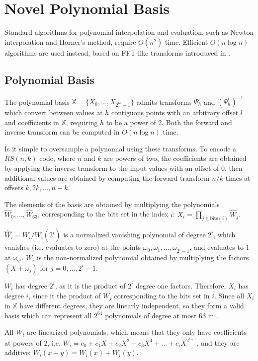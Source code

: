 \chapter{Novel Polynomial Basis}

Standard algorithms for polynomial interpolation and evaluation, such as Newton interpolation and Horner's method, require $O(n^2)$ time.
Efficient $O(n \log n)$ algorithms are used instead, based on FFT-like transforms introduced in \cite{novel-poly}.

\section{Polynomial Basis}

The polynomial basis $\mathbb{X} = \{X_0, \ldots, X_{2^{64} - 1}\}$ admits transforms $\Psi_h^l$ and $(\Psi_h^l)^{-1}$ which convert between values at $h$ contiguous points with an arbitrary offset $l$ and coefficients in $\mathbb{X}$, requiring $h$ to be a power of 2.
Both the forward and inverse transform can be computed in $O(n \log n)$ time.

Is it simple to oversample a polynomial using these transforms.
To encode a $RS(n, k)$ code, where $n$ and $k$ are powers of two, the coefficients are obtained by applying the inverse transform to the input values with an offset of $0$, then additional values are obtained by computing the forward transform $n/k$ times at offsets $k, 2k, \ldots, n - k$.

The elements of the basis are obtained by multiplying the polynomials $\hat{W}_0, \ldots, \hat{W}_{63}$, corresponding to the bits set in the index $i$: $X_i = \prod_{j \in \text{bits}(i)} \hat{W}_j$.

$\hat{W}_i = W_i / W_i(2^{i})$ is a normalized vanishing polynomial of degree $2^{i}$, which vanishes (i.e. evaluates to zero) at the points $\omega_0, \omega_1, \ldots, \omega_{2^{i} - 1}$, and evaluates to $1$ at $\omega_{2^{i}}$.
$W_i$ is the non-normalized polynomial obtained by multiplying the factors $(X + \omega_j)$ for $j = 0, \ldots, 2^{i} - 1$.

$W_i$ has degree $2^{i}$, as it is the product of $2^{i}$ degree one factors. Therefore, $X_i$ has degree $i$, since it the product of $W_j$ corresponding to the bits set in $i$.
Since all $X_i$ in $\mathbb{X}$ have different degrees, they are linearly independent, so they form a valid basis which can represent all $2^{64}$ polynomials of degree at most $63$ in .

All $W_i$ are linearized polynomials, which means that they only have coefficients at powers of $2$, i.e. $W_i = c_0 + c_1 X + c_2 X^2 + c_3 X^4 + \ldots + c_i X^{2^{i - 1}}$, and they are additive: $W_i(x + y) = W_i(x) + W_i(y)$.

